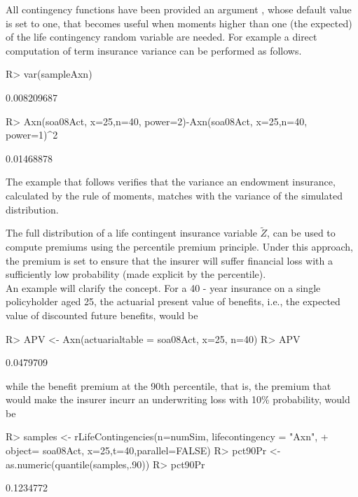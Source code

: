 \documentclass[nojss]{jss}
\begin{document}
All contingency functions have been provided an argument , whose
default value is set to one, that becomes useful when moments higher than one
(the expected) of the life contingency random variable are needed. For example a
direct computation of term insurance variance can be performed as follows.

\begin{Schunk}
\begin{Sinput}
R> var(sampleAxn)
\end{Sinput}
\begin{Soutput}
[1] 0.008209687
\end{Soutput}
\begin{Sinput}
R> Axn(soa08Act, x=25,n=40, power=2)-Axn(soa08Act, x=25,n=40, power=1)^2
\end{Sinput}
\begin{Soutput}
[1] 0.01468878
\end{Soutput}
\end{Schunk}

The example that follows verifies that the variance an endowment insurance, 
calculated by the rule of moments, matches with the variance of the simulated
distribution.


The full distribution of a life contingent insurance variable $\tilde Z$, can be
used to compute premiums using the percentile premium principle. Under this
approach, the premium is set to ensure that the insurer will suffer financial loss
with a sufficiently low probability (made explicit by the percentile).\\
An example will clarify the concept. For a 40 - year
insurance on a single policyholder aged 25, the actuarial present value of benefits, 
i.e., the expected value of discounted future benefits, would be

\begin{Schunk}
\begin{Sinput}
R> APV <- Axn(actuarialtable = soa08Act, x=25, n=40)
R> APV
\end{Sinput}
\begin{Soutput}
[1] 0.0479709
\end{Soutput}
\end{Schunk}

while the benefit premium at the 90th percentile, that is, the premium that would
make the insurer incurr an underwriting loss with 10\% probability,
would be




\begin{Schunk}
\begin{Sinput}
R> samples <- rLifeContingencies(n=numSim, lifecontingency = "Axn", 
+  		object= soa08Act, x=25,t=40,parallel=FALSE)
R> pct90Pr <- as.numeric(quantile(samples,.90))
R> pct90Pr
\end{Sinput}
\begin{Soutput}
[1] 0.1234772
\end{Soutput}
\end{Schunk}
\end{document}
